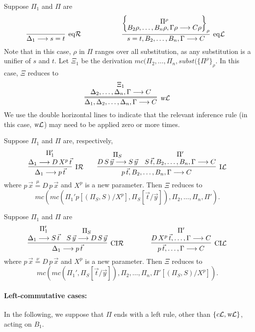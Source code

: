 \documentclass[preprint]{elsarticle}
\newcommand{\Seq}[2]{#1\longrightarrow #2}
\newcommand{\cL}{\hbox{\sl c}{\cal L}}
\newcommand{\defmu}{\stackrel{\mu}{=}}
\newcommand{\defnu}{\stackrel{\nu}{=}}
\newcommand{\eqL}{{\rm eq}{\cal L}}
\newcommand{\eqR}{{\rm eq}{\cal R}}
\newcommand{\indR}{{\rm I}{\cal R}}
\newcommand{\indL}{{\rm I}{\cal L}}
\newcommand{\coindR}{{\rm CI}{\cal R}}
\newcommand{\coindL}{{\rm CI}{\cal L}}
\newcommand{\wL}{\hbox{\sl w}{\cal L}}
\begin{document}
\begin{definition}
\begin{trivlist}
\item[\fbox{$\eqL/\eqR$}]
Suppose $\Pi_1$ and $\Pi$ are
  \begin{displaymath}
    \infer[\eqR]{\Seq{\Delta_1}{s = t}}
    {}
    \qquad\qquad\qquad
    \infer[\eqL]{\Seq{s=t,B_2,\ldots,B_n,\Gamma}{C}}
    {\left\{\raisebox{-1.5ex}
        {\deduce{\Seq{B_2\rho,\ldots,B_n\rho,\Gamma\rho}
            {C\rho}}
          {\Pi^\rho}}
      \right\}_\rho}
    \enspace 
  \end{displaymath}
  Note that in this case, $\rho$ in $\Pi$ ranges over all substitution, as any
  substitution is a unifier of $s$ and $t$. 
  Let $\Xi_1$ be the derivation 
  $mc(\Pi_2,\ldots,\Pi_n,subst(\{\Pi^\rho\}_\rho$.
  In this case, $\Xi$ reduces to
  $$
  \infer=[\wL]
  {\Seq{\Delta_1,\Delta_2,\ldots,\Delta_n,\Gamma}{C}}
  {\deduce{\Seq{\Delta_2,\ldots,\Delta_n,\Gamma}{C}}{\Xi_1}}
  $$
We use the double horizontal lines to indicate that the relevant
  inference rule (in this case, $\wL$) may need to be applied zero
  or more times.


\item[\fbox{$\indR/\indL$}] 
Suppose $\Pi_1$ and $\Pi$ are, respectively,  
$$
\infer[\indR]
{\Seq {\Delta_1}{p\,\vec t}}
{
 \deduce{\Seq{\Delta_1}{D\,X^p\,\vec t}}{\Pi_1'}
}
\qquad
\infer[\indL] {\Seq{p\,\vec{t}, B_2,\dots,B_n,\Gamma}{C}} {
  \deduce{\Seq{D\,S\,\vec{y}}{S\,\vec{y}}}{\Pi_S} &
  \deduce{\Seq{S\,\vec{t}, B_2,\dots,B_n, \Gamma} {C}}{\Pi'} }
$$
where $p\,\vec{x} \defmu D\,p\,\vec{x}$ and $X^p$ is a new
parameter.  Then $\Xi$ reduces to
$$
mc(mc(\Pi_1'p[(\Pi_S,S)/X^p], \Pi_S[\vec t/\vec y]), \Pi_2,\ldots,\Pi_n,\Pi').
$$


\item[\fbox{$\coindR/\coindL$}] Suppose $\Pi_1$ and $\Pi$ are 
$$
\infer[\coindR] 
{\Seq{\Delta_1}{p\,\vec{t}}} 
{
  \deduce{\Seq{\Delta_1}{S\,\vec{t}}}{\Pi_1'} &
  \deduce{\Seq{S\,\vec{y}}{D\,S\,\vec{y}}}{\Pi_S} 
} 
\qquad \qquad
\infer[\coindL] 
{\Seq{p\,\vec{t}, \dots, \Gamma}{C}}
{
  \deduce{\Seq{D\,X^p\,\vec{t},\dots, \Gamma}{C}}{\Pi'}
}
$$
where $p\,\vec x \defnu D\,p\,\vec x$ and $X^p$ is a new parameter.
Then $\Xi$ reduces to
$$
mc(mc(\Pi_1', \Pi_S[\vec t/\vec y]), \Pi_2,\ldots,\Pi_n,\Pi'[(\Pi_S,S)/X^p]).
$$
\end{trivlist}

\paragraph{Left-commutative cases:}

In the following, we suppose that $\Pi$ ends with a left rule,
other than $\{\cL, \wL\}$, acting on $B_1$.


\end{definition}
\end{document}
